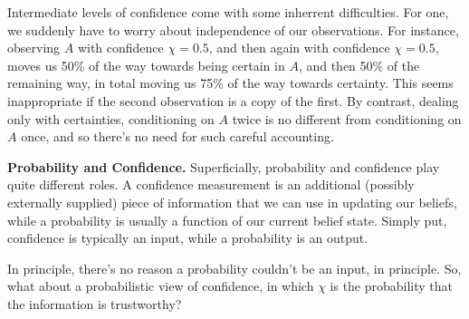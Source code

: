 \documentclass{article}
\begin{document}
Intermediate levels of confidence come with some inherrent difficulties. 
For one, we suddenly have to worry about independence of our observations. 
For instance, observing $A$ with confidence $\chi = 0.5$, and then again with confidence $\chi = 0.5$, moves us 50\% of the way towards being certain in $A$, and then 50\% of the remaining way, in total moving us 75\% of the way towards certainty. 
This seems inappropriate if the second observation is a copy of the first.
By contrast, dealing only with certainties, conditioning on $A$ twice is no different from conditioning on $A$ once, and so there's no need for such careful accounting.

%


\textbf{Probability and Confidence.}
Superficially, probability and confidence play quite different roles.
A confidence measurement is an additional (possibly externally supplied) piece of information that we can use in updating our beliefs, while a probability is usually a function of our current belief state.
Simply put, confidence is typically an input, while a probability is an output. 


In principle, there's no reason a probability couldn't be an input, in principle. 
So, what about a probabilistic view of confidence, in which $\chi$ is the probability
that the information is trustworthy?
\end{document}
